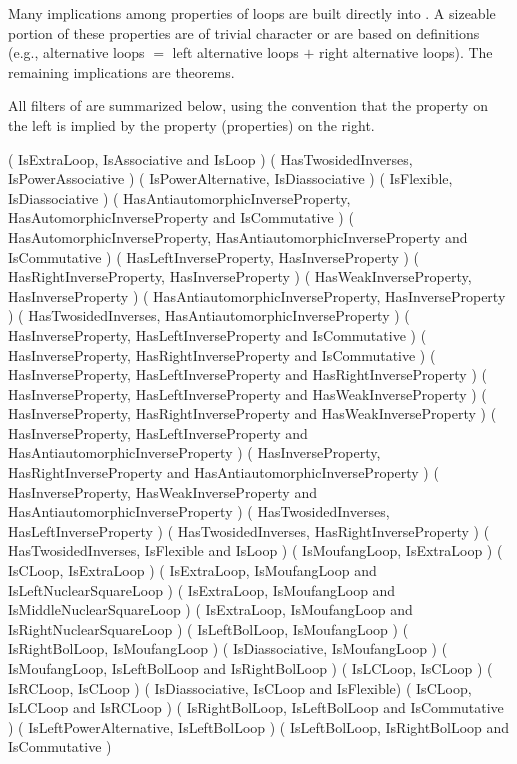 
Many implications among properties of loops are built directly into {\LOOPS}. A
sizeable portion of these properties are of trivial character or are based on
definitions (e.g., alternative loops $=$ left alternative loops $+$ right
alternative loops). The remaining implications are theorems.

All filters of {\LOOPS} are summarized below, using the {\GAP} convention that
the property on the left is implied by the property (properties) on the right.

\begintt
( IsExtraLoop, IsAssociative and IsLoop )
( HasTwosidedInverses, IsPowerAssociative )
( IsPowerAlternative, IsDiassociative )
( IsFlexible, IsDiassociative )
( HasAntiautomorphicInverseProperty, HasAutomorphicInverseProperty and IsCommutative )
( HasAutomorphicInverseProperty, HasAntiautomorphicInverseProperty and IsCommutative )
( HasLeftInverseProperty, HasInverseProperty )
( HasRightInverseProperty, HasInverseProperty )
( HasWeakInverseProperty, HasInverseProperty )
( HasAntiautomorphicInverseProperty, HasInverseProperty )
( HasTwosidedInverses, HasAntiautomorphicInverseProperty )
( HasInverseProperty, HasLeftInverseProperty and IsCommutative )
( HasInverseProperty, HasRightInverseProperty and IsCommutative )
( HasInverseProperty, HasLeftInverseProperty and HasRightInverseProperty )
( HasInverseProperty, HasLeftInverseProperty and HasWeakInverseProperty )
( HasInverseProperty, HasRightInverseProperty and HasWeakInverseProperty )
( HasInverseProperty, HasLeftInverseProperty and HasAntiautomorphicInverseProperty )
( HasInverseProperty, HasRightInverseProperty and HasAntiautomorphicInverseProperty )
( HasInverseProperty, HasWeakInverseProperty and HasAntiautomorphicInverseProperty )
( HasTwosidedInverses, HasLeftInverseProperty )
( HasTwosidedInverses, HasRightInverseProperty )
( HasTwosidedInverses, IsFlexible and IsLoop )
( IsMoufangLoop, IsExtraLoop )
( IsCLoop, IsExtraLoop )
( IsExtraLoop, IsMoufangLoop and IsLeftNuclearSquareLoop )
( IsExtraLoop, IsMoufangLoop and IsMiddleNuclearSquareLoop )
( IsExtraLoop, IsMoufangLoop and IsRightNuclearSquareLoop )
( IsLeftBolLoop, IsMoufangLoop )
( IsRightBolLoop, IsMoufangLoop )
( IsDiassociative, IsMoufangLoop )
( IsMoufangLoop, IsLeftBolLoop and IsRightBolLoop )
( IsLCLoop, IsCLoop )
( IsRCLoop, IsCLoop )
( IsDiassociative, IsCLoop and IsFlexible)
( IsCLoop, IsLCLoop and IsRCLoop )
( IsRightBolLoop, IsLeftBolLoop and IsCommutative )
( IsLeftPowerAlternative, IsLeftBolLoop )
( IsLeftBolLoop, IsRightBolLoop and IsCommutative )
